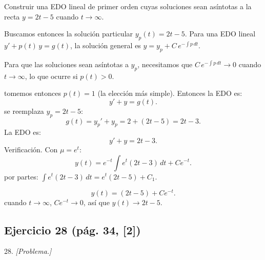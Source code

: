 \begin{respuesta}
Construir una EDO lineal de primer orden cuyas soluciones sean
as\'intotas a la recta $y = 2t - 5$ cuando $t\to\infty$.

Buscamos entonces la soluci\'on particular $y_p(t) = 2t - 5$.
Para una EDO lineal $y' + p(t)\,y = g(t)$, la soluci\'on general es
$y = y_p + C\,e^{-\int p\,dt}$.

Para que las soluciones sean as\'intotas a $y_p$, necesitamos que
$C\,e^{-\int p\,dt} \to 0$ cuando $t\to\infty$, lo que ocurre si $p(t) > 0$.

tomemos entonces $p(t) = 1$ (la elecci\'on m\'as simple). Entonces la EDO es:
\[
  y' + y = g(t).
\]
se reemplaza $y_p = 2t-5$:
\[
  g(t) = y_p' + y_p = 2 + (2t-5) = 2t - 3.
\]
La EDO es:
\[
  \boxed{y' + y = 2t - 3.}
\]
Verificaci\'on. Con $\mu = e^t$:
\[
  y(t) = e^{-t}\int e^t(2t-3)\,dt + Ce^{-t}.
\]
por partes: $\int e^t(2t-3)\,dt = e^t(2t-5)+C_1$.

\[
  y(t) = (2t-5) + Ce^{-t}.
\]
cuando $t\to\infty$, $Ce^{-t}\to 0$, as\'i que $y(t)\to 2t-5$. 
    \vspace{7cm}
\end{respuesta}

\subsection*{Ejercicio 28 \quad\normalfont\small(pág. 34, [2])}

\begin{enunciado}{28.}
    \textit{[Problema.]}
\end{enunciado}

